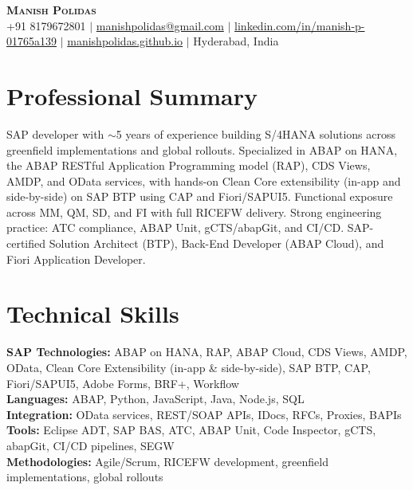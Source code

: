 \documentclass[letterpaper,11pt]{article}
\begin{document}
\begin{center}
    \textbf{\Huge \scshape Manish Polidas} \\ \vspace{1pt}
    \small +91 8179672801 $|$ \href{mailto:manishpolidas@gmail.com}{manishpolidas@gmail.com} $|$
    \href{https://www.linkedin.com/in/manish-p-01765a139/}{linkedin.com/in/manish-p-01765a139} $|$
    \href{https://manishpolidas.github.io}{manishpolidas.github.io} $|$ Hyderabad, India
\end{center}

\section{Professional Summary}
SAP developer with $\sim$5 years of experience building S/4HANA solutions across greenfield implementations and global rollouts. Specialized in ABAP on HANA, the ABAP RESTful Application Programming model (RAP), CDS Views, AMDP, and OData services, with hands-on Clean Core extensibility (in-app and side-by-side) on SAP BTP using CAP and Fiori/SAPUI5. Functional exposure across MM, QM, SD, and FI with full RICEFW delivery. Strong engineering practice: ATC compliance, ABAP Unit, gCTS/abapGit, and CI/CD. SAP-certified Solution Architect (BTP), Back-End Developer (ABAP Cloud), and Fiori Application Developer.

\section{Technical Skills}
 \begin{itemize}[leftmargin=0.15in, label={}]
    \small{\item{
     \textbf{SAP Technologies:} ABAP on HANA, RAP, ABAP Cloud, CDS Views, AMDP, OData, Clean Core Extensibility (in-app \& side-by-side), SAP BTP, CAP, Fiori/SAPUI5, Adobe Forms, BRF+, Workflow \\
     \textbf{Languages:} ABAP, Python, JavaScript, Java, Node.js, SQL \\
     \textbf{Integration:} OData services, REST/SOAP APIs, IDocs, RFCs, Proxies, BAPIs \\
     \textbf{Tools:} Eclipse ADT, SAP BAS, ATC, ABAP Unit, Code Inspector, gCTS, abapGit, CI/CD pipelines, SEGW \\
     \textbf{Methodologies:} Agile/Scrum, RICEFW development, greenfield implementations, global rollouts \\
    }}
 \end{itemize}
\end{document}
